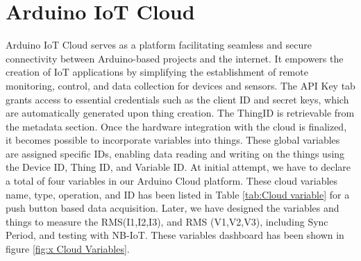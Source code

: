 \section{Arduino IoT Cloud}
Arduino IoT Cloud serves as a platform facilitating seamless and secure connectivity between Arduino-based projects and the internet. It empowers the creation of IoT applications by simplifying the establishment of remote monitoring, control, and data collection for devices and sensors. The API Key tab grants access to essential credentials such as the client ID and secret keys, which are automatically generated upon thing creation. The ThingID is retrievable from the metadata section. Once the hardware integration with the cloud is finalized, it becomes possible to incorporate variables into things. These global variables are assigned specific IDs, enabling data reading and writing on the things using the Device ID, Thing ID, and Variable ID.
At initial attempt, we have to declare a total of four variables in our Arduino Cloud platform. These cloud variables name, type, operation, and ID has been listed in Table \ref{tab:Cloud variable} for a push button based data acquisition. Later, we have designed the variables and things to measure the RMS(I1,I2,I3), and RMS (V1,V2,V3), including Sync Period, and testing with NB-IoT. These variables dashboard has been shown in figure \ref{fig:x Cloud Variables}. 

\begin{table}[htbp]
  \centering
  \caption{Arduino Cloud variables for a single push button }
  \label{tab:Cloud variable}
\end{table}

